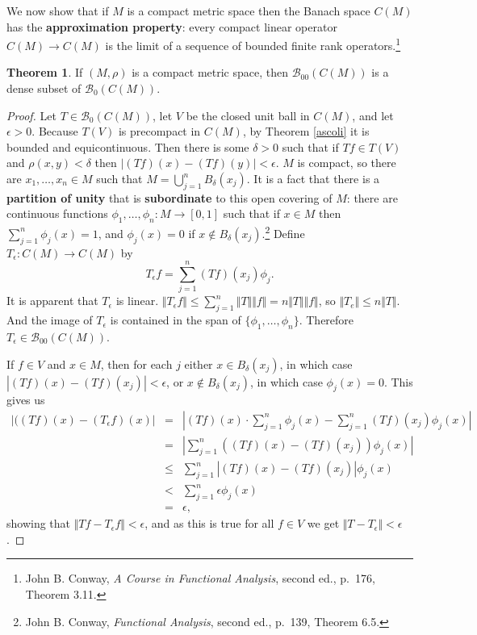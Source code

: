 \documentclass{article}
\newcommand{\norm}[1]{\Vert #1 \Vert}
\theoremstyle{definition}
\newtheorem{theorem}{Theorem}
\begin{document}
We now show that if $M$ is a compact metric space then the Banach space $C(M)$ has the \textbf{approximation property}: every compact linear operator 
$C(M) \to C(M)$ is the limit of a sequence of bounded finite
rank operators.\footnote{John B. Conway, {\em A Course in Functional Analysis}, second ed., p.~176, Theorem 3.11.}



\begin{theorem}
If $(M,\rho)$ is a compact metric space, then $\mathscr{B}_{00}(C(M))$ is a dense subset of $\mathscr{B}_0(C(M))$.
\end{theorem}
\begin{proof}
Let $T \in \mathscr{B}_0(C(M))$,  let $V$ be the closed unit ball in $C(M)$, and let $\epsilon>0$. Because $T(V)$ is precompact in $C(M)$, by Theorem \ref{ascoli} it is bounded and equicontinuous. Then there is some $\delta>0$ such that if $Tf \in T(V)$ and $\rho(x,y)<\delta$ then
$|(Tf)(x)-(Tf)(y)|<\epsilon$. $M$ is compact, so there are $x_1,\ldots,x_n \in M$ such that $M = \bigcup_{j=1}^n B_\delta(x_j)$.
It is a fact that there is a \textbf{partition of unity} that is \textbf{subordinate} to this open covering of $M$: there are continuous functions
$\phi_1,\ldots,\phi_n:M \to [0,1]$ such that if $x \in M$ then $\sum_{j=1}^n \phi_j(x)=1$, and $\phi_j(x)=0$ if $x \not \in B_\delta(x_j)$.\footnote{John 
B. Conway, {\em Functional Analysis}, second ed., p.~139, Theorem 6.5.}
Define $T_\epsilon:C(M) \to C(M)$ by
\[
T_\epsilon f = \sum_{j=1}^n (Tf)(x_j) \phi_j.
\]
It is apparent that $T_\epsilon$ is linear. $\norm{T_\epsilon f} \leq \sum_{j=1}^n \norm{T} \norm{f}=n \norm{T} \norm{f}$, so $\norm{T_e} \leq n\norm{T}$.
And the image of $T_\epsilon$ is contained in the span of $\{\phi_1,\ldots,\phi_n\}$. Therefore $T_\epsilon \in \mathscr{B}_{00}(C(M))$.

If $f \in V$ and $x \in M$, then for each $j$ either $x \in B_\delta(x_j)$, in which case $|(Tf)(x)-(Tf)(x_j)|<\epsilon$, or $x \not \in B_\delta(x_j)$,
in which case $\phi_j(x)=0$. This gives us
\begin{eqnarray*}
|((Tf)(x)-(T_\epsilon f)(x)|&=& \left|  (Tf)(x)\cdot \sum_{j=1}^n \phi_j(x) - \sum_{j=1}^n (Tf)(x_j) \phi_j(x) \right|\\
&=&\left| \sum_{j=1}^n \left( (Tf)(x) - (Tf)(x_j) \right) \phi_j(x) \right|\\
&\leq&\sum_{j=1}^n \left|  (Tf)(x) - (Tf)(x_j) \right| \phi_j(x) \\
&<&\sum_{j=1}^n \epsilon \phi_j(x)\\
&=&\epsilon,
\end{eqnarray*}
showing that $\norm{Tf - T_\epsilon f} < \epsilon$, and as this is true for all $f \in V$ we get  $\norm{T-T_\epsilon}<\epsilon$.
\end{proof}
\end{document}

